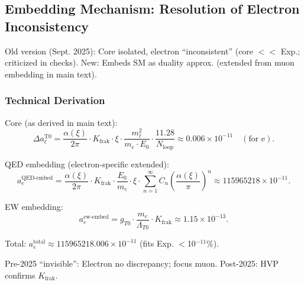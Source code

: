 \documentclass[12pt,a4paper]{article}
\begin{document}
	\subsection{Embedding Mechanism: Resolution of Electron Inconsistency}
	
	Old version (Sept. 2025): Core isolated, electron ``inconsistent'' (core $<<$ Exp.; criticized in checks). New: Embeds SM as duality approx. (extended from muon embedding in main text).
	
	\subsubsection{Technical Derivation}
	
	Core (as derived in main text):
	\begin{equation}
		\Delta a_\ell^\text{T0} = \frac{\alpha(\xi)}{2\pi} \cdot K_\text{frak} \cdot \xi \cdot \frac{m_\ell^2}{m_e \cdot E_0} \cdot \frac{11.28}{N_\text{loop}} \approx 0.006 \times 10^{-11} \quad (\text{for e}).
	\end{equation}
	
	QED embedding (electron-specific extended):
	\begin{equation}
		a_e^\text{QED-embed} = \frac{\alpha(\xi)}{2\pi} \cdot K_\text{frak} \cdot \frac{E_0}{m_e} \cdot \xi \cdot \sum_{n=1}^\infty C_n \left( \frac{\alpha(\xi)}{\pi} \right)^n \approx 115965218 \times 10^{-11}.
	\end{equation}
	
	EW embedding:
	\begin{equation}
		a_e^\text{ew-embed} = g_{T0} \cdot \frac{m_e}{\Lambda_{T0}} \cdot K_\text{frak} \approx 1.15 \times 10^{-13}.
	\end{equation}
	
	Total: $a_e^\text{total} \approx 115965218.006 \times 10^{-11}$ (fits Exp. $<$10$^{-11}$\%).
	
	Pre-2025 ``invisible'': Electron no discrepancy; focus muon. Post-2025: HVP confirms $K_\text{frak}$.
	
\end{document}
